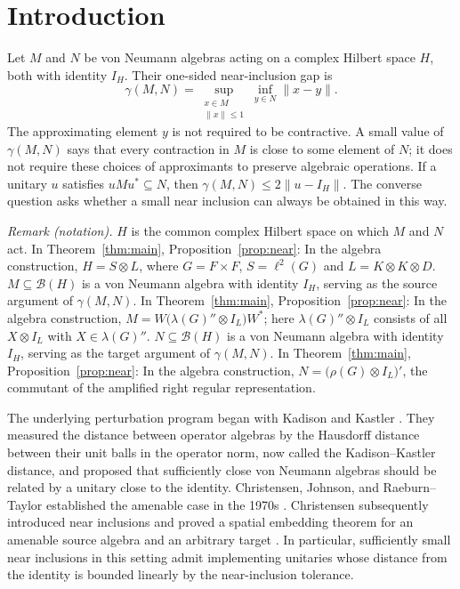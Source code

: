 \section{Introduction}\label{sec:introduction}

Let $M$ and $N$ be von Neumann algebras acting on a complex Hilbert
space $H$, both with identity $I_H$.  Their one-sided near-inclusion gap is
\begin{equation}\label{eq:gamma-definition}
 \gamma(M,N)=\sup_{\substack{x\in M\\\|x\|\leq 1}}
                   \inf_{y\in N}\|x-y\|.
\end{equation}
The approximating element $y$ is not required to be contractive.  A small
value of $\gamma(M,N)$ says that every contraction in $M$ is close to some
element of $N$; it does not require these choices of approximants to
preserve algebraic operations.  If a unitary $u$ satisfies $uMu^*\subseteq N$,
then $\gamma(M,N)\leq 2\|u-I_H\|$.  The converse question asks whether a
small near inclusion can always be obtained in this way.

\noindent\textit{Remark (notation).} $H$ is the common complex Hilbert space on which $M$ and $N$ act. In Theorem~\ref{thm:main}, Proposition~\ref{prop:near}: In the algebra construction, $H=S\otimes L$, where $G=F\times F$, $S=\ell^2(G)$ and $L=K\otimes K\otimes D$. $M\subseteq\mathcal B(H)$ is a von Neumann algebra with identity $I_H$, serving as the source argument of $\gamma(M,N)$. In Theorem~\ref{thm:main}, Proposition~\ref{prop:near}: In the algebra construction, $M=W\bigl(\lambda(G)''\otimes I_L\bigr)W^*$; here $\lambda(G)''\otimes I_L$ consists of all $X\otimes I_L$ with $X\in\lambda(G)''$. $N\subseteq\mathcal B(H)$ is a von Neumann algebra with identity $I_H$, serving as the target argument of $\gamma(M,N)$. In Theorem~\ref{thm:main}, Proposition~\ref{prop:near}: In the algebra construction, $N=\bigl(\rho(G)\otimes I_L\bigr)'$, the commutant of the amplified right regular representation.


The underlying perturbation program began with Kadison and Kastler
\cite{KK1972}.  They measured the distance between operator algebras by
the Hausdorff distance between their unit balls in the operator norm,
now called the Kadison--Kastler distance, and proposed that sufficiently
close von Neumann algebras should be related by a unitary close to the
identity.  Christensen, Johnson, and Raeburn--Taylor established the
amenable case in the 1970s
\cite{Chr1977,Joh1977,RT1977}.  Christensen subsequently introduced
near inclusions and proved a spatial embedding theorem for an amenable
source algebra and an arbitrary target
\cite[Definition~2.1 and Theorem~4.3]{Chr1980}.  In particular, sufficiently
small near inclusions in this setting admit implementing unitaries whose
distance from the identity is bounded linearly by the near-inclusion
tolerance.

